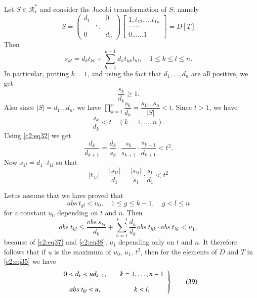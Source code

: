 Let $S\in \mathscr{R}^{\ast}_{t}$ and consider the Jacobi
transformation of $S$; namely 
\begin{equation*}
S=
\begin{pmatrix}
d_{1} &  & 0\\
 & \ddots &\\
0 & & d_{n}
\end{pmatrix}
\begin{bmatrix}
1, t_{12},\ldots t_{1n}\\
\cdots\cdots\\
0\ldots\ldots 1
\end{bmatrix}
=D[T]\tag{35}\label{c2:eq35}
\end{equation*}
Then 
$$
s_{kl}=d_{k}t_{kl}+\sum^{k-1}_{h=1}d_{h}t_{hk}t_{hl},\quad 1\leq k\leq 
l\leq n.
$$
In particular, putting $k=1$, and using the fact that
$d_{1},\ldots,d_{n}$ are all positive, we get
\begin{equation*}
\frac{s_{k}}{d_{k}}\geq 1.\tag{36}\label{c2:eq36}
\end{equation*}
Also since $|S|=d_{1}\ldots d_{n}$, we have
$\prod\limits^{n}_{k=1}\dfrac{s_{k}}{d_{k}}=\dfrac{s_{1}\ldots
  s_{n}}{|S|}<t$. Since $t>1$, we have
$$
\frac{s_{k}}{d_{k}}<t\quad (k=1,\ldots,n).
$$
Using \eqref{c2:eq32} we get
\begin{equation*}
\frac{d_{k}}{d_{k+1}}=\dfrac{d_{k}}{s_{k}}\cdot
\frac{s_{k}}{s_{k+1}}\cdot \frac{s_{k+1}}{d_{k+1}}<t^{2}.\tag{37}\label{c2:eq37}
\end{equation*}
Now $s_{1l}=d_{1}\cdot t_{1l}$ so that
$$
|t_{1l}|=\frac{|s_{1l}|}{d_{1}}=\frac{|s_{1l}|}{s_{1}}\cdot
\frac{s_{1}}{d_{1}}<t^{2} 
$$

Let\pageoriginale us assume that we have proved that
\begin{equation*}
abs\ t_{gl}<u_{0},\quad 1\leq g\leq k-1,\quad g<l\leq n\tag{38}\label{c2:eq38}
\end{equation*}
for a constant $u_{0}$ depending on $t$ and $n$. Then
$$
abs\ t_{kl}\leq
\frac{abs\ s_{kl}}{d_{k}}+\sum^{k-1}_{h=1}\frac{d_{h}}{d_{k}}abs\ t_{hk}\cdot
abs\ t_{hl}<u_{1}, 
$$
because of \eqref{c2:eq37} and \eqref{c2:eq38}, $u_{1}$ depending only on $t$
and $n$. It therefore follows that if $u$ is the maximum of $u_{0}$,
$u_{1}$, $t^{2}$, then for the elements of $D$ and $T$ in \eqref{c2:eq35}
we have
\begin{equation*}
\left.
\begin{array}{c@{\qquad}c}
0<d_{k}<ud_{k+1}, & k=1,\ldots,n-1\\[10pt]
abs\ t_{kl}<u, & k<l.
\end{array}
\right\}\tag{39}\label{c2:eq39}
\end{equation*}

